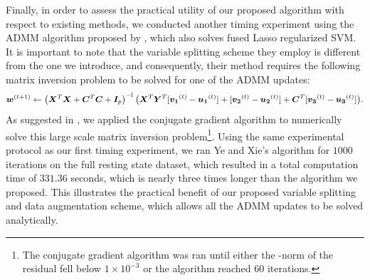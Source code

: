 Finally, in order to assess the practical utility of our proposed algorithm with respect to existing methods, we conducted another timing experiment using the ADMM algorithm proposed by \cite{Gui-Bo-Ye:2011}, which also solves fused Lasso regularized SVM.
It is important to note that the variable splitting scheme they employ is different from the one we introduce, and consequently, their method requires the following matrix inversion problem to be solved for one of the ADMM updates:
\begin{equation}
{\ensuremath{\bm{w}}}^{(t+1)} \leftarrow 
	\left(
		{\bm{X}}^T{\bm{X}} + {\bm{C}}^T{\bm{C}} + \bm{I}_p
	\right)^{-\!1}  
	\big(
		{\bm{X}}^T{\bm{Y}}^T [{\bm{v_1}}^{(t)}-{\bm{u_1}}^{(t)}] +[{\bm{v_2}}^{(t)}-{\bm{u_2}}^{(t)}] + {\bm{C}}^T[{\bm{v_3}}^{(t)}-{\bm{u_3}}^{(t)}]
	\big).
	\nonumber
\end{equation}
As suggested in \cite{Gui-Bo-Ye:2011}, we applied the conjugate gradient algorithm to numerically solve this large scale matrix inversion problem\footnote{The conjugate gradient algorithm was ran until either the \elltwo-norm of the residual fell below $1\times 10^{-3}$ or the algorithm reached $60$ iterations.}.
Using the same experimental protocol as our first timing experiment, we ran Ye and Xie's algorithm for $1000$ iterations on the full resting state dataset, which resulted in a total computation time of $331.36$ seconds,
which is nearly three times longer than the algorithm we proposed. 
This illustrates the practical benefit of our proposed variable splitting and data augmentation scheme, which allows all the ADMM updates to be solved analytically.
